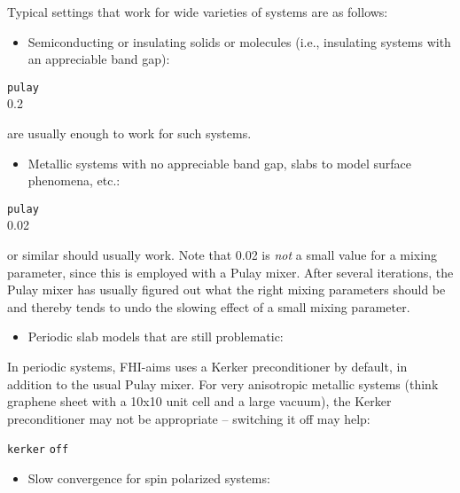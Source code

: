 Typical settings that work for wide varieties of systems are as follows:

\begin{itemize}
  \item Semiconducting or insulating solids or molecules (i.e.,
    insulating systems with an appreciable band gap):
\end{itemize}

 \texttt{pulay} \\
 0.2 \\

are usually enough to work for such systems.

\begin{itemize}
  \item Metallic systems with no appreciable band gap, slabs to model
    surface phenomena, etc.:
\end{itemize}

 \texttt{pulay} \\
 0.02 \\

or similar should usually work. Note that 
0.02 is \emph{not} a small value for a mixing parameter, since this is
employed with a Pulay mixer. After several iterations, the Pulay mixer
has usually figured out what the right mixing parameters should be and
thereby tends to undo the slowing effect of a small mixing parameter.

\begin{itemize}
  \item Periodic slab models that are still problematic:
\end{itemize}

In periodic systems, FHI-aims uses a Kerker preconditioner by default,
in addition to the usual Pulay mixer. For very anisotropic metallic
systems (think graphene sheet with a 10x10 unit cell and a large
vacuum), the Kerker preconditioner may not be appropriate -- switching
it off may help:

 \texttt{kerker} \texttt{off} \\

\begin{itemize}
  \item Slow convergence for spin polarized systems:
\end{itemize}

